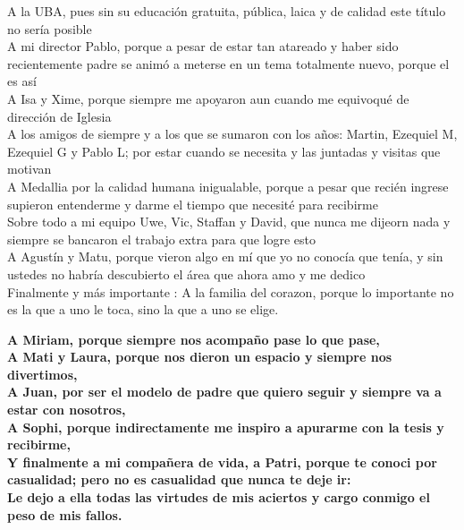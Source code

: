 \begin{center}
A la UBA, pues sin su educaci\'on gratuita, p\'ublica, laica y de calidad este t\'itulo no ser\'ia posible \\
A mi director Pablo, porque a pesar de estar tan atareado y haber sido recientemente padre se anim\'o a meterse en un tema totalmente nuevo, porque el es as\'i \\
A Isa y Xime, porque siempre me apoyaron aun cuando me equivoqu\'e de direcci\'on de Iglesia \\
A los amigos de siempre y a los que se sumaron con los a\~nos: Martin, Ezequiel M, Ezequiel G y Pablo L; por estar cuando se necesita y las juntadas y visitas que motivan \\
A Medallia por la calidad humana inigualable, porque a pesar que reci\'en ingrese supieron entenderme y darme el tiempo que necesit\'e para recibirme \\
Sobre todo a mi equipo Uwe, Vic, Staffan y David, que nunca me dijeorn nada y siempre se bancaron el trabajo extra para que logre esto \\
A Agust\'in y Matu, porque vieron algo en m\'i que yo no conoc\'ia que ten\'ia, y sin ustedes no habr\'ia descubierto el \'area que ahora amo y me dedico \\
Finalmente y m\'as importante : A la familia del corazon, porque lo importante no es la que a uno le toca, sino la que a uno se elige.
\linebreak
\linebreak

\textbf{
A Miriam, porque siempre nos acompa\~no pase lo que pase, \\
A Mati y Laura, porque nos dieron un espacio y siempre nos divertimos, \\
A Juan, por ser el modelo de padre que quiero seguir y siempre va a estar con nosotros, \\
A Sophi, porque indirectamente me inspiro a apurarme con la tesis y recibirme, \\
Y finalmente a mi compa\~nera de vida, a Patri, porque te conoci por casualidad; pero no es casualidad que nunca te deje ir: \\
Le dejo a ella todas las virtudes de mis aciertos y cargo conmigo el peso de mis fallos.
}
\end{center}
\endgroup



